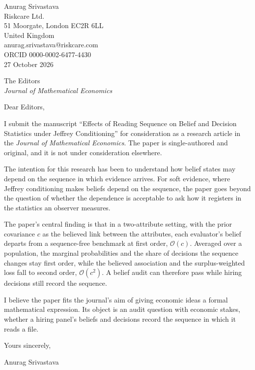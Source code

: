 \documentclass[11pt]{article}
\begin{document}
\begin{flushright}
Anurag Srivastava\\
Riskcare Ltd.\\
51 Moorgate, London EC2R 6LL\\
United Kingdom\\
anurag.srivastava@riskcare.com\\
ORCID 0000-0002-6477-4430\\[1em]
27 October 2026
\end{flushright}

The Editors\\
\emph{Journal of Mathematical Economics}

Dear Editors,

I submit the manuscript ``Effects of Reading Sequence on Belief and Decision Statistics
under Jeffrey Conditioning'' for consideration as a research article in the
\emph{Journal of Mathematical Economics}. The paper is single-authored and original, and it
is not under consideration elsewhere.

The intention for this research has been to understand how belief states may depend on the sequence in which evidence arrives. For soft evidence, where Jeffrey conditioning makes beliefs depend on the sequence, the paper goes beyond the question of whether the dependence is acceptable to ask how it registers in the statistics an observer measures.

The paper's central finding is that in a two-attribute setting, with the prior covariance $c$ as the believed link between the
attributes, each evaluator's belief departs from a sequence-free benchmark at first order,
$\mathcal{O}(c)$. Averaged over a population, the marginal probabilities and the share of
decisions the sequence changes stay first order, while the believed association and the
surplus-weighted loss fall to second order, $\mathcal{O}(c^{2})$. A belief audit can therefore pass while hiring decisions
still record the sequence.

I believe the paper fits the journal's aim of giving economic ideas a formal mathematical expression.
Its object is an audit question with economic stakes, whether a hiring panel's beliefs and
decisions record the sequence in which it reads a file. 

Yours sincerely,

\vspace{2em}
Anurag Srivastava
\end{document}
